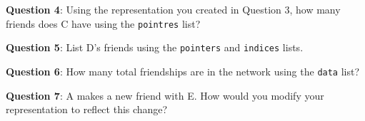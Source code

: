 \documentclass[a4paper, 14pt]{extarticle}
\begin{document}
\vspace{10em}

{\bf Question 4}:
Using the representation you created in Question 3, how many friends does C have using the \texttt{pointres} list?

\vspace{3em}

{\bf Question 5}:
List D's friends using the \texttt{pointers} and \texttt{indices} lists.

\vspace{3em}

{\bf Question 6}:
How many total friendships are in the network using the \texttt{data} list?

\vspace{3em}

{\bf Question 7}:
A makes a new friend with E. How would you modify your representation to reflect this change?

\vspace{8em}
\end{document}
